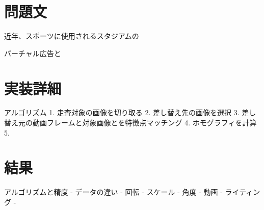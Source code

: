 \section{問題文}
近年、スポーツに使用されるスタジアムの


バーチャル広告と



\section{実装詳細}
アルゴリズム
1. 走査対象の画像を切り取る
2. 差し替え先の画像を選択
3. 差し替え元の動画フレームと対象画像とを特徴点マッチング
4. ホモグラフィを計算
5. 



\section{結果}
アルゴリズムと精度
    - データの違い
        - 回転
        - スケール
        - 角度
        - 動画
        - ライティング
    - 

